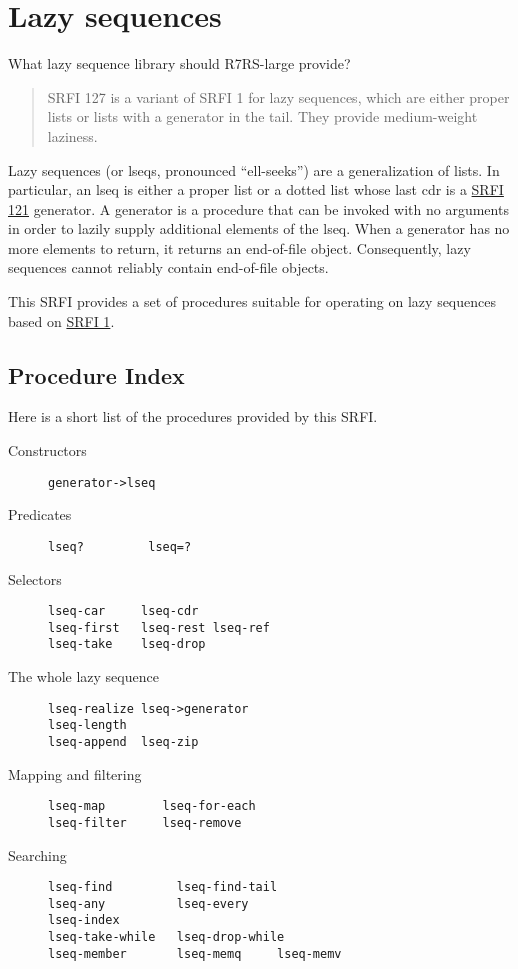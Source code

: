 \section{Lazy sequences}
 What lazy sequence library should R7RS-large provide?

\begin{quote}
SRFI 127 is a variant of SRFI 1 for lazy sequences, which are either
proper lists or lists with a generator in the tail. They provide
medium-weight laziness.
\end{quote}

Lazy sequences (or lseqs, pronounced ``ell-seeks'') are a generalization
of lists. In particular, an lseq is either a proper list or a dotted
list whose last cdr is a
\href{http://srfi.schemers.org/srfi-121/srfi-121.html}{SRFI 121}
generator. A generator is a procedure that can be invoked with no
arguments in order to lazily supply additional elements of the lseq.
When a generator has no more elements to return, it returns an
end-of-file object. Consequently, lazy sequences cannot reliably contain
end-of-file objects.

This SRFI provides a set of procedures suitable for operating on lazy
sequences based on
\href{http://srfi.schemers.org/srfi-1/srfi-1.html}{SRFI 1}.


\subsection{{Procedure Index}}\label{procedure-index}

Here is a short list of the procedures provided by this SRFI.

\begin{description}
\item[ Constructors ]
\begin{verbatim}
generator->lseq 
\end{verbatim}
\item[ Predicates ]
\begin{verbatim}
lseq?         lseq=?
\end{verbatim}
\item[ Selectors ]
\begin{verbatim}
lseq-car     lseq-cdr
lseq-first   lseq-rest lseq-ref
lseq-take    lseq-drop   
\end{verbatim}
\item[ The whole lazy sequence ]
\begin{verbatim}
lseq-realize lseq->generator
lseq-length
lseq-append  lseq-zip
\end{verbatim}
\item[ Mapping and filtering ]
\begin{verbatim}
lseq-map        lseq-for-each
lseq-filter     lseq-remove
\end{verbatim}
\item[ Searching ]
\begin{verbatim}
lseq-find         lseq-find-tail 
lseq-any          lseq-every
lseq-index
lseq-take-while   lseq-drop-while
lseq-member       lseq-memq     lseq-memv
\end{verbatim}
\end{description}

